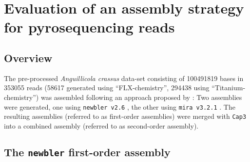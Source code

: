 
\chapter{Evaluation of an assembly strategy for pyrosequencing
  reads} %



\ifpdf
    \graphicspath{{4_eval_ass/figures/PNG/}{4_eval_ass/figures/PDF/}{4_eval_ass/figures/}}
\else
    \graphicspath{{4_eval_ass/figures/EPS/}{4_eval_ass/figures/}}
\fi



\section{Overview}
\label{sec:overview}

The pre-processed \textit{Anguillicola crassus} data-set consisting of
100491819 bases in 353055 reads (58617
generated using ``FLX-chemistry'', 294438 using
``Titanium-chemistry'') was assembled following an approach proposed
by \cite{pmid20950480}: Two assemblies were generated, one using
\texttt{newbler v2.6} \cite{pmid16056220}, the other using
\texttt{mira v3.2.1} \cite{miraEST}. The resulting assemblies
(referred to as first-order assemblies) were merged with \texttt{Cap3}
\cite{Cap3_Huang} into a combined assembly (referred to as
second-order assembly).


\section{The \texttt{newbler} first-order assembly}
\label{sec:new-fist}


